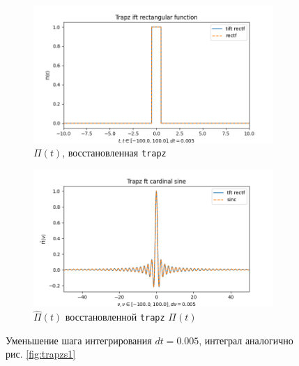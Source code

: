 \documentclass[a4paper, 12pt]{article}
\begin{document}
    \begin{figure}[H]
        \centering
        \begin{subfigure}{0.45\textwidth}
            \centering
            \includegraphics[width=\linewidth]{5_tiftr.png}
            \caption{$\Pi(t)$, восстановленная \texttt{trapz}}
            \label{fig:trectf5}
        \end{subfigure}
        \hspace{5mm}
        \begin{subfigure}{0.45\textwidth}
            \centering
            \includegraphics[width=\linewidth]{5_tftr.png}
            \caption{$\hat{\Pi}(t)$ восстановленной \texttt{trapz} $\Pi(t)$}
            \label{fig:tsinc5}
        \end{subfigure}
        \caption{Уменьшение шага интегрирования $dt=0.005$, интеграл аналогично рис. \ref{fig:trapzs1}}
        \label{fig:trapzs5}
    \end{figure}
\end{document}
